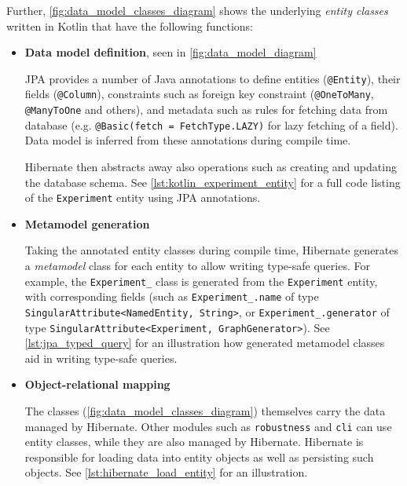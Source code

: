 Further, \autoref{fig:data_model_classes_diagram} shows the underlying \textsl{entity classes} written in Kotlin that have the following functions:
\begin{itemize}[topsep=5pt,label=$\bm{\rightarrow}$]
    \item \textbf{Data model definition}, seen in \autoref{fig:data_model_diagram}

    JPA provides a number of Java annotations to define entities (\texttt{@Entity}), their fields (\texttt{@Column}), constraints such as foreign key constraint (\texttt{@OneToMany}, \texttt{@ManyToOne} and others), and metadata such as rules for fetching data from database (e.g. \texttt{@Basic(fetch = FetchType.LAZY)} for lazy fetching of a field).
    Data model is inferred from these annotations during compile time.

    Hibernate then abstracts away also operations such as creating and updating the database schema.
    See \autoref{lst:kotlin_experiment_entity} for a full code listing of the \texttt{Experiment} entity using JPA annotations.

    

    \item \textbf{Metamodel generation}

    Taking the annotated entity classes during compile time, Hibernate generates a \textsl{metamodel} class for each entity to allow writing type-safe queries.
    For example, the \texttt{Experiment\_} class is generated from the \texttt{Experiment} entity, with corresponding fields (such as \texttt{Experiment\_.name} of type \texttt{SingularAttribute<NamedEntity, String>}, or \texttt{Experiment\_.generator} of type \texttt{SingularAttribute<Experiment, GraphGenerator>}).
    See \autoref{lst:jpa_typed_query} for an illustration how generated metamodel classes aid in writing type-safe queries.

    \item \textbf{Object-relational mapping}

    The classes (\autoref{fig:data_model_classes_diagram}) themselves carry the data managed by Hibernate.
    Other modules such as \texttt{robustness} and \texttt{cli} can use entity classes, while they are also managed by Hibernate.
    Hibernate is responsible for loading data into entity objects as well as persisting such objects.
    See \autoref{lst:hibernate_load_entity} for an illustration.
\end{itemize}

